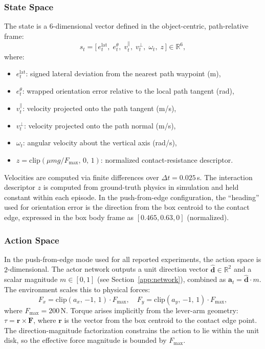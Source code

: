 \subsubsection{State Space}

The state is a $6$-dimensional vector defined in the object-centric, path-relative frame:
%
\begin{equation}
    s_t = \bigl[\, e^{\mathrm{lat}}_t,\; e^{\theta}_t,\; v^{\parallel}_t,\; v^{\perp}_t,\; \omega_t,\; z \,\bigr] \in \mathbb{R}^6,
\end{equation}
%
where:
\begin{itemize}
    \item $e^{\mathrm{lat}}_t$: signed lateral deviation from the nearest path waypoint (m),
    \item $e^{\theta}_t$: wrapped orientation error relative to the local path tangent (rad),
    \item $v^{\parallel}_t$: velocity projected onto the path tangent (m/s),
    \item $v^{\perp}_t$: velocity projected onto the path normal (m/s),
    \item $\omega_t$: angular velocity about the vertical axis (rad/s),
    \item $z = \mathrm{clip}(\mu m g / F_{\max},\, 0,\, 1)$: normalized contact-resistance descriptor.
\end{itemize}

Velocities are computed via finite differences over $\Delta t = 0.025$\,s.
The interaction descriptor $z$ is computed from ground-truth physics in simulation and held constant within each episode.
In the push-from-edge configuration, the ``heading'' used for orientation error is the direction from the box centroid to the contact edge, expressed in the box body frame as $[0.465, 0.63, 0]$ (normalized).

\subsubsection{Action Space}

In the push-from-edge mode used for all reported experiments, the action space is $2$-dimensional.
The actor network outputs a unit direction vector $\hat{\mathbf{d}} \in \mathbb{R}^2$ and a scalar magnitude $m \in [0,1]$ (see Section~\ref{app:network}), combined as $\mathbf{a}_t = \hat{\mathbf{d}} \cdot m$.
The environment scales this to physical forces:
%
\begin{equation}
    F_x = \mathrm{clip}(a_x,\, {-1},\, 1) \cdot F_{\max}, \quad F_y = \mathrm{clip}(a_y,\, {-1},\, 1) \cdot F_{\max},
\end{equation}
%
where $F_{\max} = 200$\,N.
Torque arises implicitly from the lever-arm geometry: $\tau = \mathbf{r} \times \mathbf{F}$, where $\mathbf{r}$ is the vector from the box centroid to the contact edge point.
The direction-magnitude factorization constrains the action to lie within the unit disk, so the effective force magnitude is bounded by $F_{\max}$.

